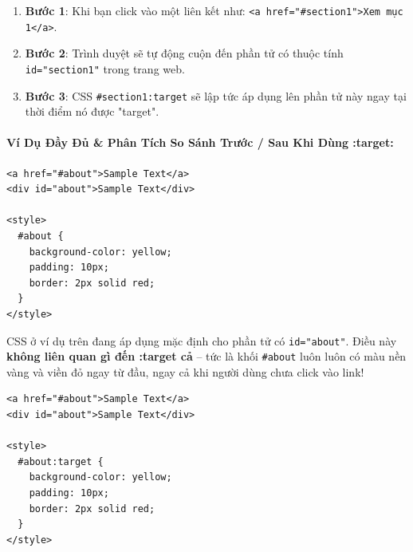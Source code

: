 \documentclass[11pt,oneside]{book}
\newcommand{\codeinline}[1]{\textcolor{accentOrange}{\texttt{#1}}}
\begin{document}
\begin{conceptBox}
\begin{enumerate}[leftmargin=1.5em, itemsep=3pt, parsep=0pt]
    \item \textbf{Bước 1}: Khi bạn click vào một liên kết như: \codeinline{<a href="\#section1">Xem mục 1</a>}.
    \item \textbf{Bước 2}: Trình duyệt sẽ tự động cuộn đến phần tử có thuộc tính \codeinline{id="section1"} trong trang web.
    \item \textbf{Bước 3}: CSS \codeinline{\#section1:target} sẽ lập tức áp dụng lên phần tử này ngay tại thời điểm nó được "target".
\end{enumerate}
\end{conceptBox}

\paragraph{Ví Dụ Đầy Đủ \& Phân Tích So Sánh Trước / Sau Khi Dùng :target:}

\begin{codeWindow}
\begin{lstlisting}[language=HTML5]
<a href="#about">Sample Text</a>
<div id="about">Sample Text</div>

<style>
  #about {
    background-color: yellow;
    padding: 10px;
    border: 2px solid red;
  }
</style>
\end{lstlisting}
\end{codeWindow}

\begin{warnBox}
CSS ở ví dụ trên đang áp dụng mặc định cho phần tử có \codeinline{id="about"}. Điều này \textbf{không liên quan gì đến :target cả} -- tức là khối \codeinline{\#about} luôn luôn có màu nền vàng và viền đỏ ngay từ đầu, ngay cả khi người dùng chưa click vào link!
\end{warnBox}

\begin{codeWindow}
\begin{lstlisting}[language=HTML5]
<a href="#about">Sample Text</a>
<div id="about">Sample Text</div>

<style>
  #about:target {
    background-color: yellow;
    padding: 10px;
    border: 2px solid red;
  }
</style>
\end{lstlisting}
\end{codeWindow}
\end{document}
